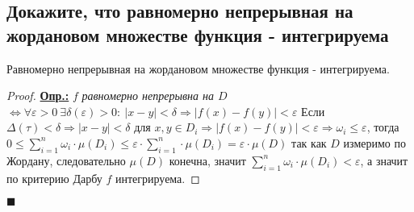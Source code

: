 
\subsection{Докажите, что равномерно непрерывная на жордановом множестве функция - интегрируема}

\begin{theorem*}
    Равномерно непрерывная на жордановом множестве функция - интегрируема.
\end{theorem*}

\begin{proof}
    \textbf{\underline{Опр.:} } $f$ \textit{равномерно непрерывна на $D$} $\Leftrightarrow\forall \varepsilon>0\ \exists\delta(\varepsilon) >0:\ |x-y|<\delta\Rightarrow |f(x)-f(y)|<\varepsilon$
    Если $\Delta(\tau) < \delta \Rightarrow |x-y|<\delta$ для $x,y\in D_i\Rightarrow |f(x)-f(y)|<\varepsilon\Rightarrow \omega_i\leq \varepsilon$, тогда
    $0\leq \sum\limits_{i=1}^n \omega_i\cdot\mu(D_i)\leq \varepsilon\cdot\sum\limits_{i=1}^n \cdot\mu(D_i)=\varepsilon\cdot\mu(D)$
    так как $D$ измеримо по Жордану, следовательно $\mu(D)$ конечна, значит $\sum\limits_{i=1}^n \omega_i\cdot\mu(D_i)<\varepsilon$, а значит по критерию Дарбу $f$ интегрируема.
\end{proof}
\begin{flushright}
$\blacksquare$
\end{flushright}
